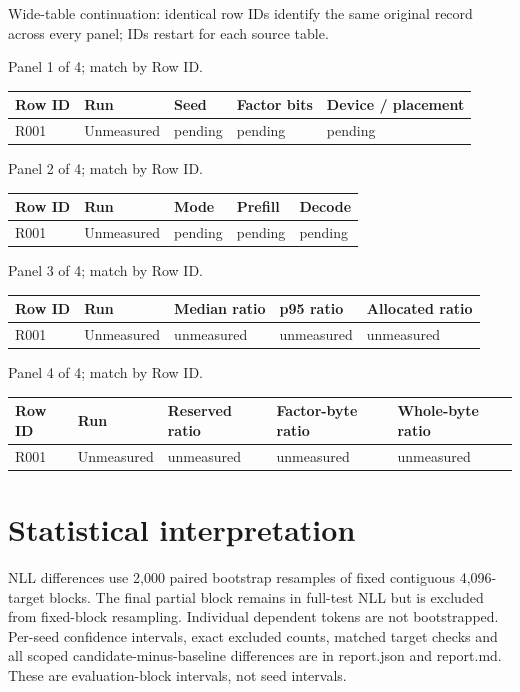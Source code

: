 \documentclass[10pt]{article}
\begin{document}
Wide-table continuation: identical row IDs identify the same original record across every panel; IDs restart for each source table.
\par\noindent Panel 1 of 4; match by Row ID.
{\scriptsize\setlength{\tabcolsep}{2pt}
\begin{longtable}{p{}p{}p{}p{}p{}}
Row ID & Run & Seed & Factor bits & Device / placement \\
\hline\endhead
R001 & Unmeasured & pending & pending & pending \\
\end{longtable}}
\par\noindent Panel 2 of 4; match by Row ID.
{\scriptsize\setlength{\tabcolsep}{2pt}
\begin{longtable}{p{}p{}p{}p{}p{}}
Row ID & Run & Mode & Prefill & Decode \\
\hline\endhead
R001 & Unmeasured & pending & pending & pending \\
\end{longtable}}
\par\noindent Panel 3 of 4; match by Row ID.
{\scriptsize\setlength{\tabcolsep}{2pt}
\begin{longtable}{p{}p{}p{}p{}p{}}
Row ID & Run & Median ratio & p95 ratio & Allocated ratio \\
\hline\endhead
R001 & Unmeasured & unmeasured & unmeasured & unmeasured \\
\end{longtable}}
\par\noindent Panel 4 of 4; match by Row ID.
{\scriptsize\setlength{\tabcolsep}{2pt}
\begin{longtable}{p{}p{}p{}p{}p{}}
Row ID & Run & Reserved ratio & Factor-byte ratio & Whole-byte ratio \\
\hline\endhead
R001 & Unmeasured & unmeasured & unmeasured & unmeasured \\
\end{longtable}}

\section{Statistical interpretation}

NLL differences use 2,000 paired bootstrap resamples of fixed contiguous 4,096-target blocks. The final partial block remains in full-test NLL but is excluded from fixed-block resampling. Individual dependent tokens are not bootstrapped. Per-seed confidence intervals, exact excluded counts, matched target checks and all scoped candidate-minus-baseline differences are in report.json and report.md. These are evaluation-block intervals, not seed intervals.
\end{document}
